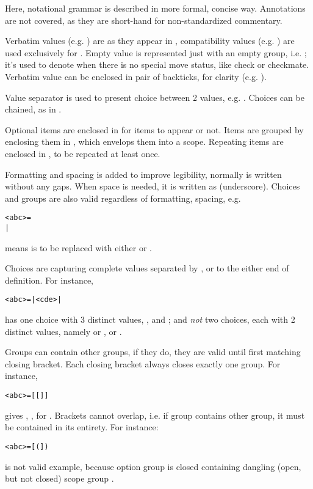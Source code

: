 Here, notational grammar is described in more formal, concise way. Annotations
are not covered, as they are short-hand for non-standardized commentary.

Verbatim values (e.g. ) are as they appear in , compatibility
values (e.g. ) are used exclusively for . Empty value is
represented just with an empty group, i.e. \algfmt{()}; it's used to denote when
there is no special move status, like check or checkmate. Verbatim value can be
enclosed in pair of backticks, for clarity (e.g. ).

Value separator \algfmt{|} is used to present choice between 2 values, e.g.
 \algfmt{|} . Choices can be chained, as in
 \algfmt{|}  \algfmt{|} .

Optional items are enclosed in \algfmt{[ ]} for items to appear or not. Items are
grouped by enclosing them in \algfmt{( )}, which envelops them into a scope.
Repeating items are enclosed in \algfmt{\{ \}}, to be repeated at least once.

\clearpage %

Formatting and spacing is added to improve legibility, normally  is
written without any gaps. When space is needed, it is written as \alg{\_}
(underscore). Choices and groups are also valid regardless of formatting,
spacing, e.g.
\begin{alltt}
<abc> = 
  | 
\end{alltt}
means  is to be replaced with either  or .

Choices are capturing complete values separated by \algfmt{|}, or to the either
end of definition. For instance,
\begin{alltt}
<abc> =  |  <cde>  | 
\end{alltt}
has one choice with 3 distinct values, ,  and
; and \emph{not} two choices, each with 2 distinct values, namely  or
,  or .

Groups can contain other groups, if they do, they are valid until first matching
closing bracket. Each closing bracket always closes exactly one group. For instance,
\begin{alltt}
<abc> =  [  [  ]  ] 
\end{alltt}
gives , ,  for .
Brackets cannot overlap, i.e. if group contains other group, it must be contained in
its entirety. For instance:
\begin{alltt}
<abc> =  [  (  ]  ) 
\end{alltt}
is not valid example, because option group \algfmt{[ ]} is closed containing
dangling (open, but not closed) scope group \algfmt{( )}.

